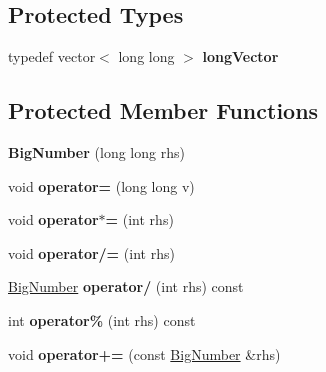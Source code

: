 \subsection*{Protected Types}
\begin{DoxyCompactItemize}
\item 
\mbox{\label{class_big_number_a4cbf05c8e4a1d87ca2a15ce475019cae}} 
typedef vector$<$ long long $>$ {\bfseries long\+Vector}
\end{DoxyCompactItemize}
\subsection*{Protected Member Functions}
\begin{DoxyCompactItemize}
\item 
\mbox{\label{class_big_number_a7099e86d7549e5205149c190c8a55279}} 
{\bfseries Big\+Number} (long long rhs)
\item 
\mbox{\label{class_big_number_ad241c0850f449cb1267aa76cc8a9a860}} 
void {\bfseries operator=} (long long v)
\item 
\mbox{\label{class_big_number_aa210f7fc509bc46d4585f5c8615d7ca2}} 
void {\bfseries operator$\ast$=} (int rhs)
\item 
\mbox{\label{class_big_number_a3bee869f054f09cae2457875231a793a}} 
void {\bfseries operator/=} (int rhs)
\item 
\mbox{\label{class_big_number_af36cd8c22fcb26ada133f2234efc5140}} 
\mbox{\hyperlink{class_big_number}{Big\+Number}} {\bfseries operator/} (int rhs) const
\item 
\mbox{\label{class_big_number_a6115f5a21b5b03690218ae600e1ed4e3}} 
int {\bfseries operator\%} (int rhs) const
\item 
\mbox{\label{class_big_number_a847f88d5ae19d9a518024ddb1b7a564e}} 
void {\bfseries operator+=} (const \mbox{\hyperlink{class_big_number}{Big\+Number}} \&rhs)
\item 
\mbox{\label{class_big_number_a30c51d4be9e6796d914057e61328b5ee}} 

\end{DoxyCompactItemize}
